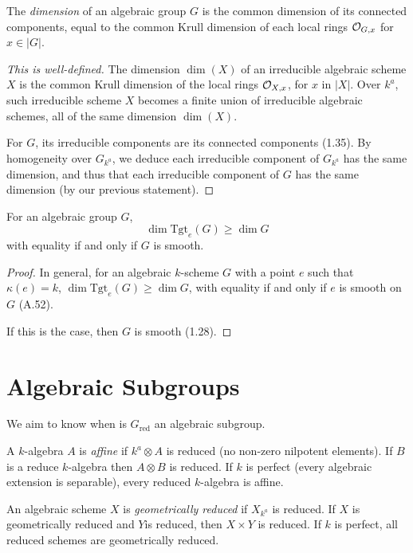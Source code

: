 \documentclass{memoir}
\begin{document}
\begin{definition}
	The \emph{dimension} of an algebraic group $G$ is the common dimension
	of its connected components, equal to the common Krull dimension of each
	local rings $\mathcal{O}_{G,x}$ for $x \in |G|$.
\end{definition}

\begin{proof}[This is well-defined]
	The dimension $\dim(X)$ of an irreducible algebraic scheme $X$ is the
	common Krull dimension of the local rings $\mathcal{O}_{X,x}$, for $x$ in $|X|$.
	Over $k^a$, such irreducible scheme $X$ becomes a finite union of
	irreducible algebraic schemes, all of the same dimension $\dim(X)$.
	
	For $G$, its irreducible components are its connected components
	(1.35). By homogeneity over $G_{k^a}$, we deduce each
	irreducible component of $G_{k^a}$ has the same dimension,
	and thus that each irreducible component of
	$G$ has the same dimension (by our previous statement).
\end{proof}

\begin{proposition}[1.37]
	For an algebraic group $G$,
	$$\dim \mathrm{Tgt}_e(G) \ge \dim G$$
	with equality if and only if $G$ is smooth.
\end{proposition}

\begin{proof}
	In general, for an algebraic $k$-scheme $G$ with a point $e$ such that
	$\kappa(e)=k$, $\dim\mathrm{Tgt}_e (G) \ge \dim G$, with equality if and only
	if $e$ is smooth on $G$ (A.52).
	
	If this is the case, then $G$ is smooth (1.28).
\end{proof}

\section{Algebraic Subgroups}

We aim to know when is $G_{\text{red}}$ an algebraic subgroup.

\begin{definition}
	A $k$-algebra $A$ is \emph{affine} if $k^a\otimes A$ is reduced
	(no non-zero nilpotent elements). If $B$ is a reduce $k$-algebra
	then $A \otimes B$ is reduced. If $k$ is perfect
	(every algebraic extension is separable), every reduced
	$k$-algebra is affine.
\end{definition}

\begin{definition}
	An algebraic scheme $X$ is \emph{geometrically reduced} if $X_{k^a}$
	is reduced. If $X$ is geometrically reduced and $Y$is reduced, then
	$X\times Y$ is reduced. If $k$ is perfect, all reduced schemes are
	geometrically reduced.
\end{definition}
\end{document}
